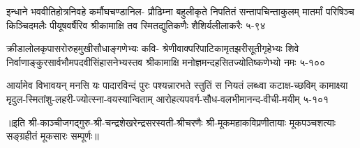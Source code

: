 \annofourlineindentedshloka
{इन्धाने भववीतिहोत्रनिवहे कर्मौघचण्डानिल-}
{प्रौढिम्ना बहुलीकृते निपतितं सन्तापचिन्ताकुलम्}
{मातर्मां परिषिञ्च किञ्चिदमलैः पीयूषवर्षैरिव}
{श्रीकामाक्षि तव स्मितद्युतिकणैः शैशिर्यलीलाकरैः}
{५-९४}

\annofourlineindentedshloka
{क्रीडालोलकृपासरोरुहमुखीसौधाङ्गणेभ्यः कवि-}
{श्रेणीवाक्परिपाटिकामृतझरीसूतीगृहेभ्यः शिवे}
{निर्वाणाङ्कुरसार्वभौमपदवीसिंहासनेभ्यस्तव}
{श्रीकामाक्षि मनोज्ञमन्दहसितज्योतिष्कणेभ्यो नमः}
{५-१००}

\annofourlineindentedshloka
{आर्यामेव विभावयन् मनसि यः पादारविन्दं पुरः}
{पश्यन्नारभते स्तुतिं स नियतं लब्ध्वा कटाक्ष-च्छविम्}
{कामाक्ष्या मृदुल-स्मितांशु-लहरी-ज्योत्स्ना-वयस्यान्विताम्}
{आरोहत्यपवर्ग-सौध-वलभीमानन्द-वीची-मयीम्}
{५-१०१}

॥इति श्री-काञ्चीजगद्गुरु-श्री-चन्द्रशेखरेन्द्रसरस्वती-श्रीचरणैः श्री-मूकमहाकविप्रणीतायाः मूकपञ्चशत्याः सङ्ग्रहीतं मूकसारः सम्पूर्णः॥

\setlength{\shlokaspaceskip}{24pt}